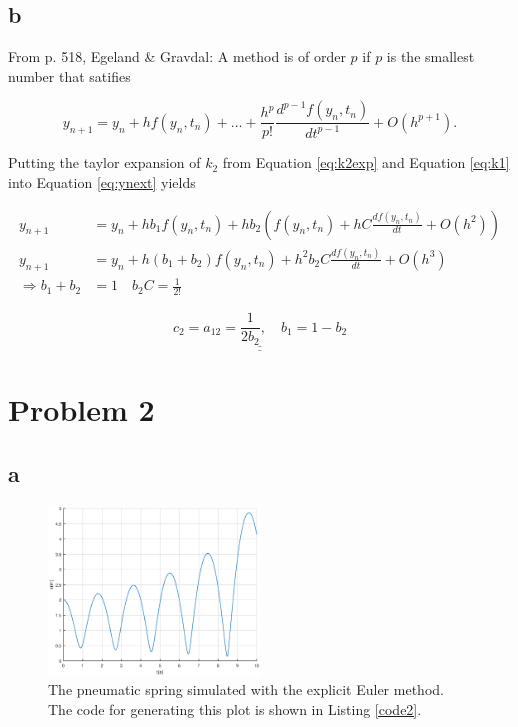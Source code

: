 \documentclass{article}
\begin{document}
\subsection{b}

From p. 518, Egeland \& Gravdal:
A method is of order $p$ if $p$ is the smallest number that satifies

\begin{equation}\label{eq:order}
	y_{n+1} = y_n + hf(y_n,t_n) + ... + \frac{h^p}{p!} \frac{d^{p-1}f(y_n,t_n)}{dt^{p-1}} + O(h^{p+1}).
\end{equation}

Putting the taylor expansion of $k_2$ from Equation \ref{eq:k2exp} and Equation \ref{eq:k1} into Equation \ref{eq:ynext} yields

\begin{align*}
	y_{n+1} &= y_n + hb_1f(y_n,t_n) + hb_2(f(y_n,t_n) + hC\frac{df(y_n,t_n)}{dt} + O(h^2))\\
	y_{n+1} &= y_n + h(b_1+b_2)f(y_n,t_n) + h^2b_2C\frac{df(y_n,t_n)}{dt} + O(h^3) \\
	\Rightarrow b_1+b_2 &= 1 \quad b_2C = \frac{1}{2!}
\end{align*}

\begin{equation*}
	\underline{\underline{c_2 = a_{12} = \frac{1}{2b_2}, \quad b_1 = 1-b_2}}
\end{equation*}


\section{Problem 2}

\subsection{a}

\begin{figure}[!ht]\label{fig:spring2a}
	\centering
	\includegraphics[width = 0.5\textwidth]{ModSim_ex4_2a}
    \caption{The pneumatic spring simulated with the explicit Euler method. The code for generating this plot is shown in Listing \ref{code2}.}
\end{figure}
\end{document}
